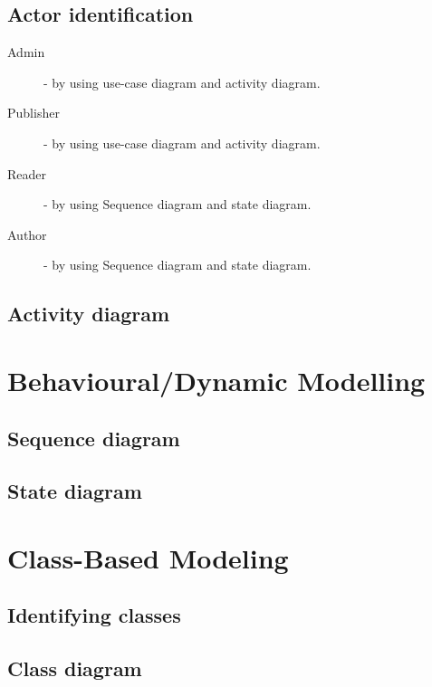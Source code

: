 	\subsection{Actor identification}

	\begin{description}
		\item[Admin] - by using use-case diagram and activity diagram.
		\item[Publisher] - by using use-case diagram and activity diagram.
		\item[Reader] - by using Sequence diagram and state diagram.
		\item[Author] - by using Sequence diagram and state diagram.
	\end{description}

	

	

	\subsection{Activity diagram}

	


\section{Behavioural/Dynamic Modelling}
	\subsection{Sequence diagram}

	

	\subsection{State diagram}

	

\section{Class-Based Modeling}
	\subsection{Identifying classes}
	\subsection{Class diagram}
